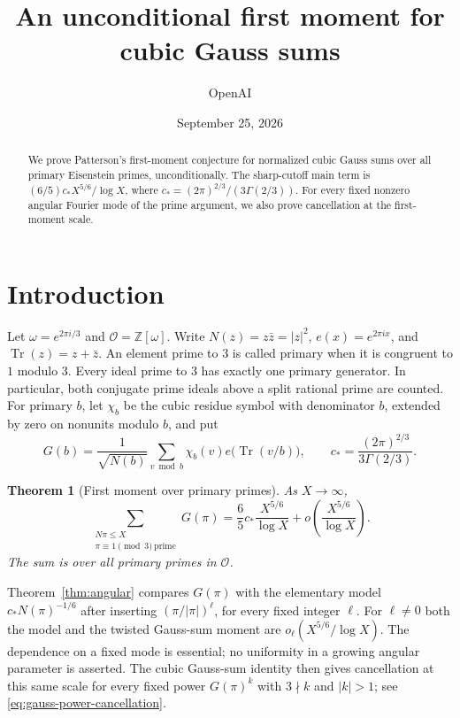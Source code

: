 \documentclass[11pt]{article}
\title{An unconditional first moment for cubic Gauss sums}
\author{OpenAI}
\date{September 25, 2026}
\newtheorem{theorem}{Theorem}[section]
\theoremstyle{definition}
\theoremstyle{remark}
\numberwithin{equation}{section}
\DeclareMathOperator{\Tr}{Tr}
\begin{document}
\maketitle
\begin{abstract}
We prove Patterson's first-moment conjecture for normalized cubic
Gauss sums over all primary Eisenstein primes, unconditionally. The sharp-cutoff main
term is $(6/5)c_*X^{5/6}/\log X$, where
$c_*=(2\pi)^{2/3}/(3\Gamma(2/3))$.
For every fixed nonzero angular Fourier mode of the prime argument,
we also prove cancellation at the first-moment scale.
\end{abstract}

\section{Introduction}
Let $\omega=e^{2\pi i/3}$ and $\mathcal O=\mathbb Z[\omega]$.
Write $N(z)=z\bar z=|z|^2$, $e(x)=e^{2\pi i x}$, and
$\Tr(z)=z+\bar z$. An element prime to $3$ is called primary when it
is congruent to $1$ modulo $3$. Every ideal prime to $3$ has exactly
one primary generator. In particular, both conjugate prime ideals
above a split rational prime are counted.
For primary $b$, let $\chi_b$ be the cubic residue symbol with
denominator $b$, extended by zero on nonunits modulo $b$, and put
\begin{equation}\label{eq:gauss-definition}
 G(b)=\frac{1}{\sqrt{N(b)}}\sum_{v\bmod b}\chi_b(v)
           e\bigl(\Tr(v/b)\bigr),
 \qquad c_* = \frac{(2\pi)^{2/3}}{3\Gamma(2/3)}.
\end{equation}

\begin{theorem}[First moment over primary primes]\label{thm:main}
As $X\longrightarrow\infty$,
\begin{equation}\label{eq:main}
 \sum_{\substack{N\pi\le X\\\pi\equiv1\pmod3\ \mathrm{prime}}}G(\pi)
 =\frac65c_*\frac{X^{5/6}}{\log X}
   +o\!\left(\frac{X^{5/6}}{\log X}\right).
\end{equation}
The sum is over all primary primes in $\mathcal O$.
\end{theorem}

Theorem~\ref{thm:angular} compares $G(\pi)$ with the elementary
model $c_*N(\pi)^{-1/6}$ after inserting $(\pi/|\pi|)^\ell$,
for every fixed integer $\ell$.
For $\ell\ne0$ both the model and the twisted Gauss-sum moment are
$o_\ell(X^{5/6}/\log X)$. The dependence on a fixed mode is essential;
no uniformity in a growing angular parameter is asserted.
The cubic Gauss-sum identity then gives cancellation at this same
scale for every fixed power $G(\pi)^k$ with $3\nmid k$ and
$|k|>1$; see \eqref{eq:gauss-power-cancellation}.
\end{document}
